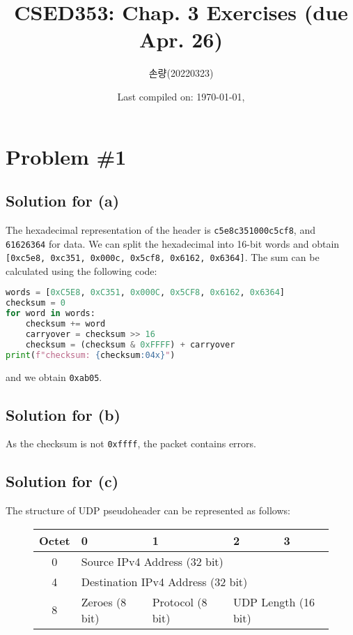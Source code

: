 \documentclass{scrartcl}
\title{CSED353: Chap. 3 Exercises (due Apr. 26)}
\author{손량(20220323)}
\date{Last compiled on: \today, \currenttime}
\begin{document}
\maketitle

\section{Problem \#1}

\subsection{Solution for (a)}

The hexadecimal representation of the header is \texttt{c5e8c351000c5cf8}, and
\texttt{61626364} for data. We can split the hexadecimal into 16-bit words and
obtain \texttt{[0xc5e8, 0xc351, 0x000c, 0x5cf8, 0x6162, 0x6364]}. The sum can be
calculated using the following code:

\begin{lstlisting}[language=Python]
words = [0xC5E8, 0xC351, 0x000C, 0x5CF8, 0x6162, 0x6364]
checksum = 0
for word in words:
    checksum += word
    carryover = checksum >> 16
    checksum = (checksum & 0xFFFF) + carryover
print(f"checksum: {checksum:04x}")
\end{lstlisting}

and we obtain \texttt{0xab05}.

\subsection{Solution for (b)}

As the checksum is not \texttt{0xffff}, the packet contains errors.

\subsection{Solution for (c)}

The structure of UDP pseudoheader can be represented as follows:

\begin{figure}[H]
\centering
\begin{tabularx}{\textwidth}{ |c| *{4}{X|} }
\hline
Octet & 0 & 1 & 2 & 3 \\ \hline
0 & \multicolumn{4}{l|}{Source IPv4 Address (32 bit)} \\ \hline
4 & \multicolumn{4}{l|}{Destination IPv4 Address (32 bit)} \\ \hline
8 & Zeroes (8 bit) & Protocol (8 bit) & \multicolumn{2}{l|}{UDP Length (16 bit)} \\ \hline
\end{tabularx}
\end{figure}
\end{document}
